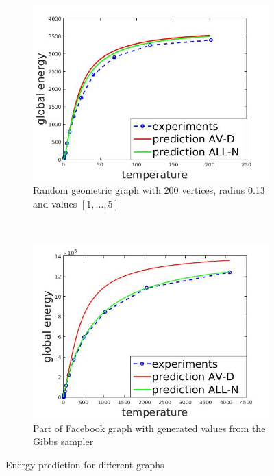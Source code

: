 \documentclass[12pt]{report}
\begin{document}
\begin{figure}[t]
\begin{subfigure}[b]{0.4\textwidth}
    \end{subfigure}   
    
    \begin{subfigure}[b]{0.4\textwidth}
        \includegraphics[width=\textwidth]{rgg200x013}
        \caption{ Random geometric graph with 200 vertices, radius 0.13 and values $[1, ..., 5]$ }

    \end{subfigure}
    ~
    \begin{subfigure}[b]{0.4\textwidth}
        \includegraphics[width=\textwidth]{facebookEnergy}
        \caption{ Part of Facebook graph \cite{Facebook} with generated values from the Gibbs sampler }

    \end{subfigure}
    
    \caption{Energy prediction for different graphs}
    \label{fig:energyPrediction}
\end{figure}
\end{document}
